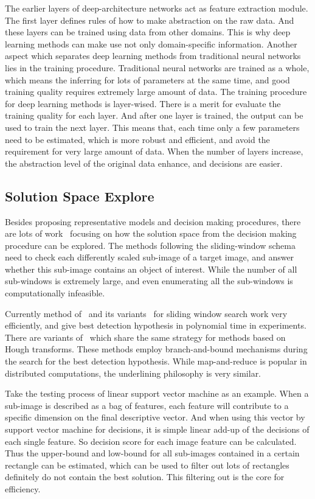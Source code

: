 The earlier layers of deep-architecture networks act as feature extraction module. The first layer defines rules of how to make abstraction on the raw data. And these layers can be trained using  data from other domains. This is why deep learning methods can make use not only domain-specific information. Another aspect which separates deep learning methods from traditional neural networks lies in the training procedure. Traditional neural networks are trained as a whole, which means the inferring for lots of parameters at the same time, and good training quality  requires extremely large amount of data. The training procedure for deep learning methods is layer-wised. There is a merit for evaluate the training quality for each layer. And after one layer is trained, the output can be used to train the next layer. This means that, each time only a few parameters need to be estimated, which is more robust and efficient, and avoid the requirement for very large amount of data. When the number of layers increase, the abstraction level of the original data enhance, and decisions are easier.


\subsection{Solution Space Explore}
Besides proposing representative models and decision making procedures, there are lots of work~\citep{408,spm,ciod} focusing on how the solution space from the decision making procedure can be explored. The methods following the sliding-window schema need to check each differently scaled sub-image of a target image, and answer whether this sub-image contains an object of interest. While the number of all sub-windows is extremely large, and even enumerating all the sub-windows is computationally infeasible.

Currently method of~\citep{ij15} and its variants~\citep{ac1} for sliding window search work very efficiently, and give best detection hypothesis in polynomial time in experiments. There are variants of~\citep{ac27} which share the same strategy for methods based on Hough transforms. These methods employ branch-and-bound mechanisms during the search for the best detection hypothesis. While map-and-reduce is popular in distributed computations, the underlining philosophy is very similar.

Take the testing process of linear support vector machine as an example. When a sub-image is described as a bag of features, each feature will contribute to a specific dimension on the final descriptive vector.
And when using this vector by support vector machine for decisions, it is simple linear add-up of the decisions of each single feature. So decision score for each image feature can be calculated. Thus the upper-bound and low-bound for all sub-images contained in a certain rectangle can be estimated, which can be used to filter out lots of rectangles definitely do not contain the best solution. This filtering out is the core for efficiency.

